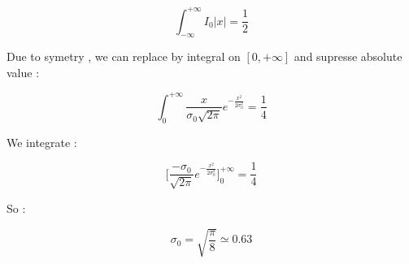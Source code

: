 \begin{equation}
    \int_{-\infty}^{+\infty} I_0 |x| = \frac{1}{2}
\end{equation}

Due to symetry , we can replace by integral on $[0,+\infty]$ and supresse absolute value :

\begin{equation}
    \int_{0}^{+\infty} \frac{x}{\sigma_0 \sqrt{2\pi}} e^{-\frac{x^2}{2\sigma_0^2}}  = \frac{1}{4}
\end{equation}

We integrate :

\begin{equation}
      \lbrack  \frac{-\sigma_0}{\sqrt{2\pi}} e^{-\frac{x^2}{2\sigma_0^2}}\rbrack  _{0}^{+\infty}  = \frac{1}{4}
\end{equation}

So :

\begin{equation}
      \sigma_0 = \sqrt{\frac{\pi}{8}} \simeq 0.63
\end{equation}


